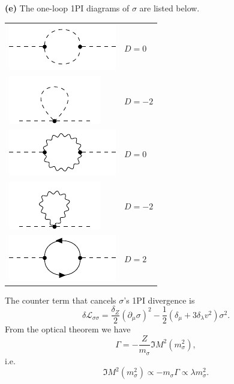\documentclass{article}
\makeatletter
\newcommand*{\shifttext}[1]{%
  \settowidth{\@tempdima}{#1}%
  \hspace{-\@tempdima}#1%
}
\newcommand{\plabel}[1]{%
\shifttext{\textbf{#1}\quad}%
}
\makeatother
\begin{document}
\plabel{(e)}%
The one-loop 1PI diagrams of $\sigma$ are listed below.
\begin{center}
    \begin{tabular}{m{4cm} m{3cm}}
        \centering
            \includegraphics{img/yukawa/1pi/sigma-sigma/sigma-sigma.pdf}
         & $D=0$ \\
        \centering
            \includegraphics{img/yukawa/1pi/sigma-sigma/sigma2-sigma.pdf}
         & $D=-2$ \\
         \centering
            \includegraphics{img/yukawa/1pi/sigma-pi/sigma-pi.pdf}
         & $D=0$ \\
         \centering
            \includegraphics{img/yukawa/1pi/sigma-pi/sigma2-pi.pdf}
         & $D=-2$ \\
         \centering
            \includegraphics{img/yukawa/1pi/sigma-psi/sigma-psi.pdf}
         & $D=2$
    \end{tabular}
\end{center}
The counter term that cancels $\sigma$'s 1PI divergence is
\[ \delta \mathcal{L}_{\sigma\sigma} = \frac{\delta_Z}{2}(\partial_\mu \sigma)^2 - \frac{1}{2}(\delta_\mu + 3\delta_\lambda v^2) \sigma^2. \]
From the optical theorem we have
\[ \Gamma = -\frac{Z}{m_\sigma} \Im M^2(m_\sigma^2), \]
i.e.
\[ \Im M^2(m_\sigma^2) \propto -m_\sigma \Gamma \propto \lambda m^2_\sigma. \]
\end{document}
